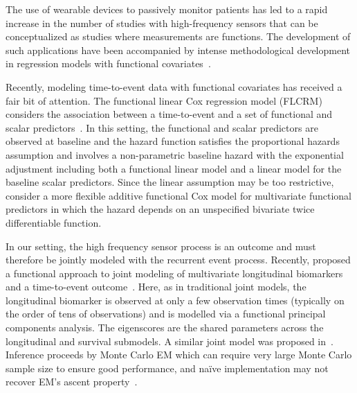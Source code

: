 \documentclass[12pt]{amsart}
\newenvironment{newmaterial}{\color{blue}}{\par}
\begin{document}
\begin{newmaterial}
The use of wearable devices to passively monitor patients has led to a rapid increase in the number of studies with high-frequency sensors that can be conceptualized as studies where measurements are functions.
The development of such applications have been accompanied by intense methodological development in regression models with functional covariates~\citep{James2002,JamesSilverman2005,muller2005,Ramsay2005,kokoszka2017,doi:10.1198/jasa.2009.tm08564,doi:10.1198/016214507000000527}.

Recently, modeling time-to-event data with functional covariates has received a fair bit of attention.  The functional linear Cox regression model (FLCRM) considers the association between a time-to-event and a set of functional and scalar predictors~\citep{https://doi.org/10.1111/biom.12748}. In this setting, the functional and scalar predictors are observed at baseline and the hazard function satisfies the proportional hazards assumption and involves a non-parametric baseline hazard with the exponential adjustment including both a functional linear model and a linear model for the baseline scalar predictors.
Since the linear assumption may be too restrictive,~\cite{doi:10.1080/10618600.2020.1853550} consider a more flexible additive functional Cox model for multivariate functional predictors in which the hazard depends on an unspecified bivariate twice differentiable function.

In our setting, the high frequency sensor process is an outcome and must therefore be jointly modeled with the recurrent event process.  Recently, \cite{Li2022} proposed a functional approach to joint modeling of multivariate longitudinal biomarkers and a time-to-event outcome~\citep{Tsiatis2004,Rizopoulos2010}.  Here, as in traditional joint models, the longitudinal biomarker is observed at only a few observation times (typically on the order of tens of observations) and is modelled via a functional principal components analysis.  The eigenscores are the shared parameters across the longitudinal and survival submodels.  A similar joint model was proposed in~\cite{Dong2021}.  Inference proceeds by Monte Carlo EM which can require very large Monte Carlo sample size to ensure good performance, and na{\"i}ve implementation may not recover EM's ascent property~\citep{Caffo2005}.


\end{newmaterial}
\end{document}
